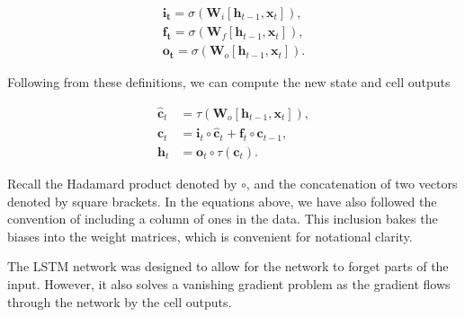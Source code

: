 \begin{align}
\mathbf{i_t} = \sigma(\mathbf{W}_i[\mathbf{h}_{t-1}, \mathbf{x}_t]),\\
\mathbf{f_t} = \sigma(\mathbf{W}_f[\mathbf{h}_{t-1}, \mathbf{x}_t]),\\
\mathbf{o_t} = \sigma(\mathbf{W}_o[\mathbf{h}_{t-1}, \mathbf{x}_t]).
\end{align}

\noindent Following from these definitions, we can compute the new state and cell outputs

\begin{align}
\hat{\mathbf{c}}_t &= \tau (\mathbf{W}_o[\mathbf{h}_{t-1}, \mathbf{x}_t]), \\
\mathbf{c}_t &= \mathbf{i}_t \circ \hat{\mathbf{c}}_t + \mathbf{f}_t \circ \mathbf{c}_{t-1}, \\ 
\mathbf{h}_t &= \mathbf{o}_t \circ \tau (\mathbf{c}_t).
\end{align}

\noindent Recall the Hadamard product denoted by $\circ$, and the concatenation of two vectors denoted by square brackets. In the equations above, we have also followed the convention of including a column of ones in the data. This inclusion bakes the biases into the weight matrices, which is convenient for notational clarity. 

The LSTM network was designed to allow for the network to forget parts of the input. However, it also solves a vanishing gradient problem as the gradient flows through the network by the cell outputs.
